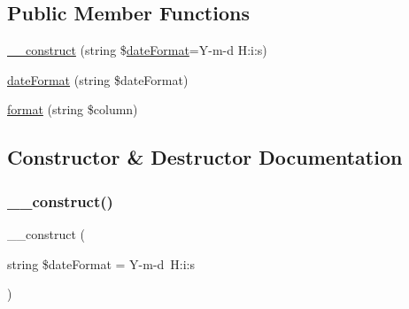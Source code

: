 \subsection*{Public Member Functions}
\begin{DoxyCompactItemize}
\item 
\hyperlink{classhamburgscleanest_1_1_data_tables_1_1_models_1_1_column_formatters_1_1_date_column_a0115f0c68a42cda38a3ab35261da68ec}{\+\_\+\+\_\+construct} (string \$\hyperlink{classhamburgscleanest_1_1_data_tables_1_1_models_1_1_column_formatters_1_1_date_column_a6ab68973747a78d533feb978aaf8eebc}{date\+Format}=\textquotesingle{}Y-\/m-\/d H\+:i\+:s\textquotesingle{})
\item 
\hyperlink{classhamburgscleanest_1_1_data_tables_1_1_models_1_1_column_formatters_1_1_date_column_a6ab68973747a78d533feb978aaf8eebc}{date\+Format} (string \$date\+Format)
\item 
\hyperlink{classhamburgscleanest_1_1_data_tables_1_1_models_1_1_column_formatters_1_1_date_column_aba259f7ae8b25e70bd444020c04606e7}{format} (string \$column)
\end{DoxyCompactItemize}


\subsection{Constructor \& Destructor Documentation}
\mbox{\label{classhamburgscleanest_1_1_data_tables_1_1_models_1_1_column_formatters_1_1_date_column_a0115f0c68a42cda38a3ab35261da68ec}} 
\subsubsection{\texorpdfstring{\+\_\+\+\_\+construct()}{\_\_construct()}}
{\footnotesize\ttfamily \+\_\+\+\_\+construct (\begin{DoxyParamCaption}\item[{string}]{\$date\+Format = {\ttfamily \textquotesingle{}Y-\/m-\/d~H\+:i\+:s\textquotesingle{}} }\end{DoxyParamCaption})}


